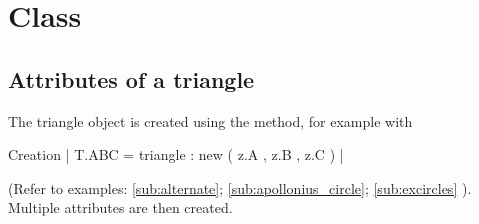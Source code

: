 \newpage
\section{Class } %
\label{sec:class_triangle}

\subsection{Attributes of a triangle} %
\label{sub:attributes_of_a_triangle}
The triangle object is created using the  method, for example with
\begin{mybox}
   Creation  | T.ABC = triangle : new ( z.A , z.B , z.C ) |
\end{mybox}
(Refer to examples:  \ref{sub:alternate}; \ref{sub:apollonius_circle}; \ref{sub:excircles} ). Multiple attributes are then created.


